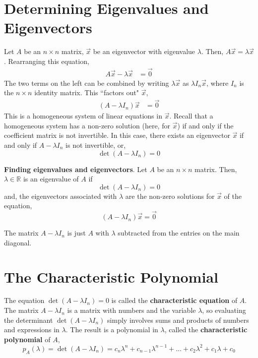\documentclass[letterpaper,12pt]{article}
\begin{document}
\section*{Determining Eigenvalues and Eigenvectors}
Let $A$ be an $n \times n$ matrix, $\vec{x}$ be an eigenvector with eigenvalue $\lambda$. Then, $A\vec{x} = \lambda \vec{x}$. Rearranging this equation,
\begin{align*}
    A\vec{x} - \lambda \vec{x} & = \vec{0}
\end{align*}
The two terms on the left can be combined by writing $\lambda \vec{x}$ as $\lambda I_n \vec{x}$, where $I_n$ is the $n \times n$ identity matrix. This ``factors out" $\vec{x}$,
\begin{align*}
    (A - \lambda I_n) \vec{x} & = \vec{0}
\end{align*}
This is a homogeneous system of linear equations in $\vec{x}$. Recall that a homogeneous system has a non-zero solution (here, for $\vec{x}$) if and only if the coefficient matrix is not invertible. In this case, there exists an eigenvector $\vec{x}$ if and only if $A - \lambda I_n$ is not invertible, or,
\begin{equation*}
    \det(A - \lambda I_n) = 0
\end{equation*}

\begin{theorem}
\textbf{Finding eigenvalues and eigenvectors}. Let $A$ be an $n \times n$ matrix. Then, $\lambda \in \mathbb{R}$ is an eigenvalue of $A$ if
\begin{equation*}
    \det(A - \lambda I_n) = 0
\end{equation*}
and, the eigenvectors associated with $\lambda$ are the non-zero solutions for $\vec{x}$ of the equation,
\begin{equation*}
    (A - \lambda I_n) \vec{x} = \vec{0}
\end{equation*}
\end{theorem}

The matrix $A - \lambda I_n$ is just $A$ with $\lambda$ subtracted from the entries on the main diagonal.

\section*{The Characteristic Polynomial}
The equation $\det(A - \lambda I_n) = 0$ is called the \textbf{characteristic equation} of $A$. The matrix $A - \lambda I_n$ is a matrix with numbers and the variable $\lambda$, so evaluating the determinant $\det(A - \lambda I_n)$ simply involves sums and products of numbers and expressions in $\lambda$. The result is a polynomial in $\lambda$, called the \textbf{characteristic polynomial} of $A$,
\begin{equation*}
    p_A(\lambda) = \det{(A - \lambda I_n)} = c_n \lambda^n + c_{n-1} \lambda^{n-1} + \dots + c_2 \lambda^2 + c_1 \lambda + c_0
\end{equation*}
\end{document}
